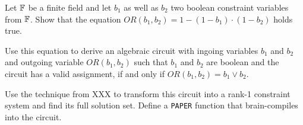 \begin{exercise} Let $\mathbb{F}$ be a finite field and let $b_1$ as well as $b_2$ two boolean constraint variables from $\mathbb{F}$. Show that the equation 
$OR(b_1,b_2) = 1 - (1 - b_1)\cdot (1 - b_2)$ holds true.

Use this equation to derive an algebraic circuit with ingoing variables $b_1$ and $b_2$ and outgoing variable $OR(b_1,b_2)$ such that $b_1$ and $b_2$ are boolean  and the circuit has a valid assignment, if and only if $OR(b_1,b_2) = b_1 \vee b_2$.  

Use the technique from XXX to transform this circuit into a rank-1 constraint system and find its full solution set. Define a \texttt{PAPER} function that brain-compiles into the circuit. 
\begin{comment}
\begin{center}
\digraph[scale=0.4]{BOOLOR}{
  forcelabels=true;
  center=true;
  splines=ortho;
  nodesep= 2.0;
  nOR1 -> nOR5 [xlabel="S_1  "] ;
  nOR2 -> nOR7 [xlabel="S_2  "] ;
  nOR3 -> {nOR5, nOR7, nOR10} ;
  nOR4 -> {nOR6, nOR8, nOR11} ;
  nOR5 -> nOR6; 
  nOR6 -> nOR9 ;
  nOR7 -> nOR8 ;
  nOR8 -> nOR9 ;
  nOR9 -> nOR10 [xlabel="S_3  "] ;
  nOR10 -> nOR11 ;
  nOR11 -> nOR12 [xlabel="S_4  "] ;

  nOR1 [shape=box, label="b_1"] ;
  nOR2 [shape=box, label="b_2"] ;
  nOR3 [shape=box, label="-1"] ;
  nOR4 [shape=box, label="1"] ;
  nOR5 [label="*"] ;
  nOR6 [label="+"] ;
  nOR7 [label="*"] ;
  nOR8 [label="+"] ;
  nOR9 [label="*"] ;
  nOR10 [label="*"] ;
  nOR11 [label="+"] ;
  nOR12 [shape=box, label="OR(b_1,b_2)"] ;
}
\end{center}
The associated rank-1 constraint system can be deduced from the general process XXX\sme{add reference} and consists of the following constraints
\begin{align*}
 (1- S_1) \cdot (1-S_2) & = S_3\\
  (1-S_3)\cdot 1 &= S_4
\end{align*}
Common circuit languages typically provide a gadget or a function to abstract over this circuit such that programers can use the $\vee$ operator without caring about the associated circuit. In \texttt{PAPER}, we define the following function that compiles to the $\vee$-operator's circuit:
\begin{lstlisting}
fn OR(b_1 : BOOL, b_2 : BOOL) -> OR(b_1,b_2) : BOOL{
  constant c1 = 1 ;
  constant c2 = -1 ;
  OR(b_1,b_2) <== ADD(c1,MUL(MUL(ADD(c1,MUL(b_1,c2)),ADD(c1,MUL(b_1,c2))),c2))  ;
}
\end{lstlisting}
In the setup phase of a statement, we compile every occurrence of the $\mathtt{OR}$ function into an instance of its associated $\vee$-operator's circuit.
\end{comment} 
\end{exercise}
